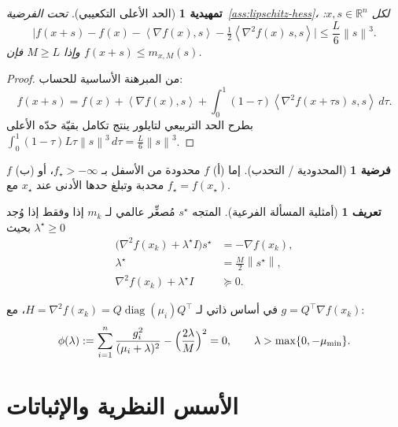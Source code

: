 \documentclass[11pt,a4paper]{article}
\theoremstyle{plain}
\newtheorem{lemma}[theorem]{تمهيدية}
\theoremstyle{definition}
\newtheorem{assumption}[theorem]{فرضية}
\newtheorem{definition}[theorem]{تعريف}
\newcommand{\R}{\mathbb{R}}
\newcommand{\norm}[1]{\left\|#1\right\|}
\newcommand{\inner}[2]{\left\langle #1,#2\right\rangle}
\newcommand{\grad}{\nabla}
\newcommand{\hess}{\nabla^{2}}
\begin{document}
\begin{lemma}[الحد الأعلى التكعيبي]
\label{lem:cubic-majorant}
تحت الفرضية~\ref{ass:lipschitz-hess}، لكل $x,s\in\R^{n}$:
\begin{equation}
\bigl|f(x+s)-f(x)-\inner{\grad f(x)}{s}-\tfrac12\inner{\hess f(x)\,s}{s}\bigr|
\le
\frac{L}{6}\norm{s}^{3}.
\end{equation}
وإذا $M\ge L$ فإن $f(x+s)\le m_{x,M}(s)$.
\end{lemma}

\begin{proof}
من المبرهنة الأساسية للحساب:
\[
f(x+s)
=
f(x)+\inner{\grad f(x)}{s}
+
\int_{0}^{1}(1-\tau)\inner{\hess f(x+\tau s)\,s}{s}\,d\tau.
\]
بطرح الحد التربيعي لتايلور ينتج تكامل بقيّة حدّه الأعلى
$\int_{0}^{1}(1-\tau)L\tau\norm{s}^{3}\,d\tau=\frac{L}{6}\norm{s}^{3}$.
\end{proof}

\begin{assumption}[المحدودية / التحدب]
\label{ass:bounded}
إما (أ) $f$ محدودة من الأسفل بـ $f_{\star}>-\infty$، أو (ب) $f$ محدبة وتبلغ حدها الأدنى عند $x_{\star}$ مع $f_{\star}=f(x_{\star})$.
\end{assumption}

\begin{definition}[أمثلية المسألة الفرعية]
\label{def:subopt}
المتجه $s^{\star}$ مُصغِّر عالمي لـ $m_{k}$ إذا وفقط إذا وُجد $\lambda^{\star}\ge 0$ بحيث~\cite{conn2000trust}
\begin{align}
\bigl(\hess f(x_{k})+\lambda^{\star} I\bigr)s^{\star}
&=
-\grad f(x_{k}),
\label{eq:opt-lin}\\
\lambda^{\star}
&=
\tfrac{M}{2}\norm{s^{\star}},
\label{eq:opt-sec}\\
\hess f(x_{k})+\lambda^{\star} I
&\succeq 0.
\label{eq:opt-psd}
\end{align}
\end{definition}

في أساس ذاتي لـ $H=\hess f(x_{k})=Q\operatorname{diag}(\mu_{i})Q^{\top}$، مع $g=Q^{\top}\grad f(x_{k})$:
\begin{equation}
\label{eq:secular}
\phi(\lambda)
:=
\sum_{i=1}^{n}\frac{g_{i}^{2}}{(\mu_{i}+\lambda)^{2}}
-
\Bigl(\frac{2\lambda}{M}\Bigr)^{2}
=
0,
\qquad
\lambda>\max\{0,-\mu_{\min}\}.
\end{equation}

\section{الأسس النظرية والإثباتات}
\label{sec:theory}
\end{document}
